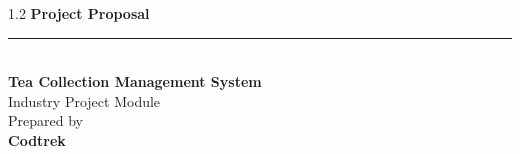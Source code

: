 \documentclass[12pt]{article}
\begin{document}
\begin{titlepage}


    \centering
    \vspace*{1.8cm}
    \begin{spacing}{1.2}
    {\Huge \textbf{Project Proposal}}\\[0.6cm]
    \rule{0.72\textwidth}{0.6pt}\\[0.8cm]
    {\LARGE \textbf{Tea Collection Management System}}\\[0.7cm]
    {\Large Industry Project Module}\\[1.6cm]
    {\large Prepared by}\\[0.2cm]
    {\Large \textbf{Codtrek}}\\[0.4cm]
    \end{spacing}
    \vfill

    \restoregeometry
\end{titlepage}


\pagebreak


\tableofcontents
\pagebreak          











%

\pagebreak


\pagebreak


\pagebreak

\end{document}
